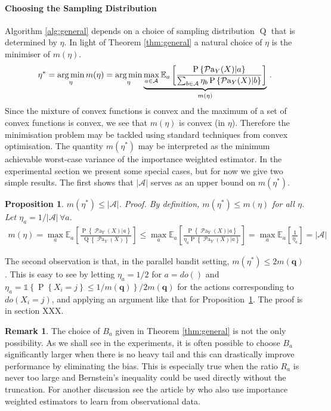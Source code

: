 \documentclass[11pt,a4paper,oneside]{book}
\newcommand{\Q}[1]{\operatorname{Q}\left\{#1\right\}}
\newcommand{\EE}{\mathbb E}
\newcommand{\EEa}{\EE_a}
\newcommand{\Pn}[2]{\operatorname{P}\left\{#2|#1\right\}}
\newcommand{\calA}{\mathcal A}
\newcommand{\set}[1]{\left\{#1\right\}}
\newcommand{\ind}[1]{\mathds{1}\!\!\set{#1}}
\newcommand{\argmin}{\operatornamewithlimits{arg\,min}}
\newcommand{\eq}[1]{\begin{align*}#1\end{align*}}
\renewcommand{\P}[1]{\operatorname{P}\left\{#1\right\}}
\newcommand{\parents}[1]{\operatorname{\mathcal{P}a}_{#1}}
\theoremstyle{plain}
\newtheorem{proposition}[theorem]{Proposition}
\theoremstyle{definition}
\newtheorem{remark}[theorem]{Remark}
\begin{document}
\paragraph{Choosing the Sampling Distribution} Algorithm \ref{alg:general} depends on a choice of sampling distribution $\operatorname{Q}$ that is determined by $\eta$. In light of Theorem \ref{thm:general}
a natural choice of $\eta$ is the minimiser of $m(\eta)$.
\eq{
\eta^* 
= \argmin_\eta m(\eta) = \argmin_\eta \underbrace{\max_{a \in \calA} \EEa \left[\frac{\Pn{a}{\parents{Y}(X)}}{\sum_{b \in \calA} \eta_b \Pn{b}{\parents{Y}(X)}}\right]}_{m(\eta)}\,.
}
Since the mixture of convex functions is convex and the maximum of a set of convex functions is convex, we see that $m(\eta)$ is convex (in $\eta$).
Therefore the minimisation problem may be tackled using standard techniques from convex optimisation. The quantity $m(\eta^*)$ may be interpreted as the minimum achievable worst-case variance of the importance weighted estimator. In the experimental section we present some special cases, but for now we give two simple results. The first shows that $|\calA|$ serves as an upper bound on $m(\eta^*)$.

\begin{proposition}\label{pro:m-bound}
$m(\eta^*) \leq |\calA|$. \textit{Proof.} 
\textup{By definition, $m(\eta^*) \leq m(\eta)$ for all $\eta$. Let $\eta_a = 1/|\calA|\,\forall a$.}
\eq{
m(\eta) 
= \max_a \EEa\left[\frac{\Pn{a}{\parents{Y}(X)}}{\Q{\parents{Y}(X)}}\right] 
\leq \max_a \EEa\left[\frac{\Pn{a}{\parents{Y}(X)}}{\eta_a \Pn{a}{\parents{Y}(X)}}\right] 
= \max_a \EEa\left[\frac{1}{\eta_a}\right] = |\calA| %
}
\end{proposition} 

The second observation is that, in the parallel bandit setting, $m(\eta^*) \leq 2m(\boldsymbol{q})$. This is easy to see by letting $\eta_a = 1/2$ for $a = do()$ and $\eta_a = \ind{\P{X_i = j} \leq 1/m(\boldsymbol{q})} / 2m(\boldsymbol{q})$ for the actions corresponding to $do(X_i=j)$, and applying an argument like that for Proposition~\ref{pro:m-bound}. 
The proof is in section XXX.

\begin{remark}\label{rem:truncate}
The choice of $B_a$ given in Theorem \ref{thm:general} is not the only possibility. As we shall see in the experiments, it is 
often possible to choose $B_a$ significantly
larger when there is no heavy tail and this can drastically improve performance by eliminating the bias. This is especially true when the ratio $R_a$ is never too large
and Bernstein's inequality could be used directly without the truncation. For another discussion see the article by \citet{BJQ13} who also use importance weighted estimators
to learn from observational data.
\end{remark}
\end{document}
